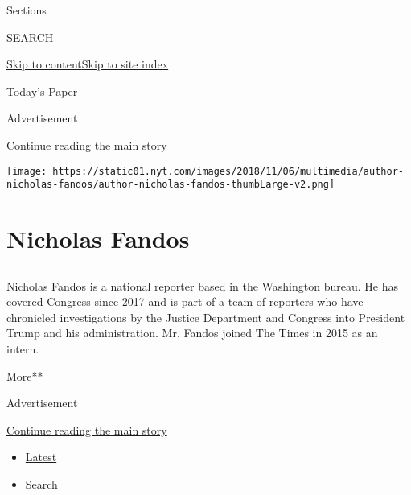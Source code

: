Sections

SEARCH

\protect\hyperlink{site-content}{Skip to
content}\protect\hyperlink{site-index}{Skip to site index}

\href{https://myaccount.nytimes.com/auth/login?response_type=cookie\&client_id=vi}{}

\href{https://www.nytimes.com/section/todayspaper}{Today's Paper}

Advertisement

\protect\hyperlink{after-top}{Continue reading the main story}

\texttt{[image: https://static01.nyt.com/images/2018/11/06/multimedia/author-nicholas-fandos/author-nicholas-fandos-thumbLarge-v2.png]}

\hypertarget{nicholas-fandos}{%
\section{Nicholas Fandos}\label{nicholas-fandos}}

\hypertarget{section}{%
\subsection{}\label{section}}

Nicholas Fandos is a national reporter based in the Washington bureau.
He has covered Congress since 2017 and is part of a team of reporters
who have chronicled investigations by the Justice Department and
Congress into President Trump and his administration. Mr. Fandos joined
The Times in 2015 as an intern.

More**

Advertisement

\protect\hyperlink{after-mid1}{Continue reading the main story}

\begin{itemize}
\tightlist
\item
  \protect\hyperlink{stream-panel}{Latest}
\item
  Search
\end{itemize}

